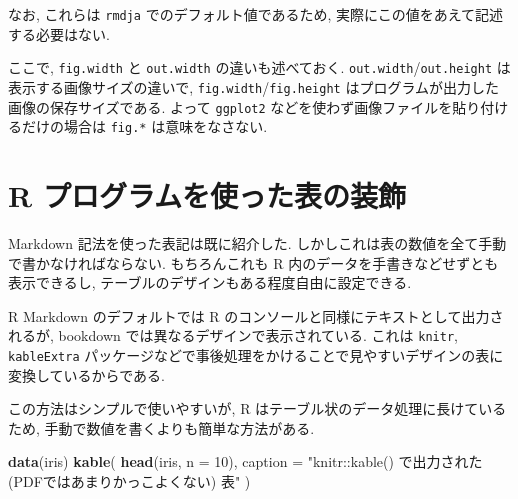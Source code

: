 \documentclass[
  nomag]{bxjsbook}
\newenvironment{Shaded}{\begin{snugshade}}{\end{snugshade}}
\newcommand{\DataTypeTok}[1]{\textcolor[rgb]{0.13,0.29,0.53}{#1}}
\newcommand{\DecValTok}[1]{\textcolor[rgb]{0.00,0.00,0.81}{#1}}
\newcommand{\KeywordTok}[1]{\textcolor[rgb]{0.13,0.29,0.53}{\textbf{#1}}}
\newcommand{\NormalTok}[1]{#1}
\newcommand{\StringTok}[1]{\textcolor[rgb]{0.31,0.60,0.02}{#1}}
\theoremstyle{definition}
\theoremstyle{definition}
\theoremstyle{definition}
\theoremstyle{remark}
\begin{document}
なお, これらは \texttt{rmdja} でのデフォルト値であるため,
実際にこの値をあえて記述する必要はない.

ここで, \texttt{fig.width} と \texttt{out.width} の違いも述べておく.
\texttt{out.width}/\texttt{out.height} は表示する画像サイズの違いで,
\texttt{fig.width}/\texttt{fig.height}
はプログラムが出力した画像の保存サイズである. よって \texttt{ggplot2}
などを使わず画像ファイルを貼り付けるだけの場合は \texttt{fig.*}
は意味をなさない.

\hypertarget{r-ux30d7ux30edux30b0ux30e9ux30e0ux3092ux4f7fux3063ux305fux8868ux306eux88c5ux98fe}{%
\section{R
プログラムを使った表の装飾}\label{r-ux30d7ux30edux30b0ux30e9ux30e0ux3092ux4f7fux3063ux305fux8868ux306eux88c5ux98fe}}

Markdown 記法を使った表記は既に紹介した.
しかしこれは表の数値を全て手動で書かなければならない. もちろんこれも R
内のデータを手書きなどせずとも表示できるし,
テーブルのデザインもある程度自由に設定できる.

R Markdown のデフォルトでは R
のコンソールと同様にテキストとして出力されるが, bookdown
では異なるデザインで表示されている. これは \texttt{knitr},
\texttt{kableExtra}
パッケージなどで事後処理をかけることで見やすいデザインの表に変換しているからである.

この方法はシンプルで使いやすいが, R
はテーブル状のデータ処理に長けているため,
手動で数値を書くよりも簡単な方法がある.

\begin{Shaded}
\begin{Highlighting}[numbers=left,,]
\KeywordTok{data}\NormalTok{(iris)}
\KeywordTok{kable}\NormalTok{(}
  \KeywordTok{head}\NormalTok{(iris, }\DataTypeTok{n =} \DecValTok{10}\NormalTok{),}
  \DataTypeTok{caption =} \StringTok{"\textasciigrave{}knitr::kable()\textasciigrave{} で出力された (PDFではあまりかっこよくない) 表"}
\NormalTok{)}
\end{Highlighting}
\end{Shaded}
\end{document}
